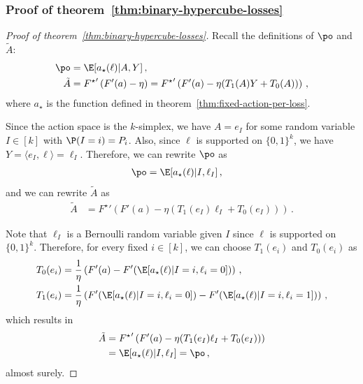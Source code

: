 \subsubsection{Proof of theorem~\ref{thm:binary-hypercube-losses}}
\label{proof:thm:binary-hypercube-losses}
\begin{proof}[Proof of theorem~\ref{thm:binary-hypercube-losses}]
    Recall the definitions of $\po$ and $\tilde{A}$:
    \begin{align*}
        \po       & = \E[a_\star(\ell) | A, Y]\,,          \\
        \tilde{A} & = {F^\star}'\left(F'(a) - \eta \right)
        = {F^\star}'\left(F'(a) - \eta (T_1(A)Y + T_0(A))\right)\,,
    \end{align*}
    where $a_\star$ is the function defined in theorem~\ref{thm:fixed-action-per-loss}.

    Since the action space is the $k$-simplex,
    we have $A = e_I$ for some random variable $I \in [k]$ with
    $\P(I = i) = P_i$.
    Also, since $\ell$ is supported on $\{0,1\}^k$,
    we have $Y = \langle e_I, \ell \rangle = \ell_I$.
    Therefore, we can rewrite $\po$ as
    \begin{align*}
        \po & = \E[a_\star(\ell) | I, \ell_I]\,,
    \end{align*}
    and we can rewrite $\tilde{A}$ as
    \begin{align*}
        \tilde{A} & = {F^\star}'\left(F'(a) - \eta (T_1(e_I)\ell_I + T_0(e_I))\right)\,.
    \end{align*}

    Note that $\ell_I$ is a Bernoulli random variable
    given $I$ since $\ell$ is supported on $\{0,1\}^k$.
    Therefore, for every fixed $i \in [k]$,
    we can choose $T_1(e_i)$ and $T_0(e_i)$ as
    \begin{align*}
        T_0(e_i) & = \frac{1}{\eta}
        \left(F'(a) - F'(\E[a_\star(\ell) | I = i, \ell_i = 0])\right)\,, \\
        T_1(e_i) & = \frac{1}{\eta}
        \left(F'(\E[a_\star(\ell) | I = i, \ell_i = 0])
        - F'(\E[a_\star(\ell) | I = i, \ell_i = 1])\right)\,,
    \end{align*}
    which results in
    \begin{align*}
        \tilde{A} & =
        {F^\star}'\left(F'(a) - \eta (T_1(e_I)\ell_I + T_0(e_I))\right) \\
                  & =
        \E[a_\star(\ell) | I, \ell_I] = \po\,,
    \end{align*}
    almost surely.
\end{proof}

